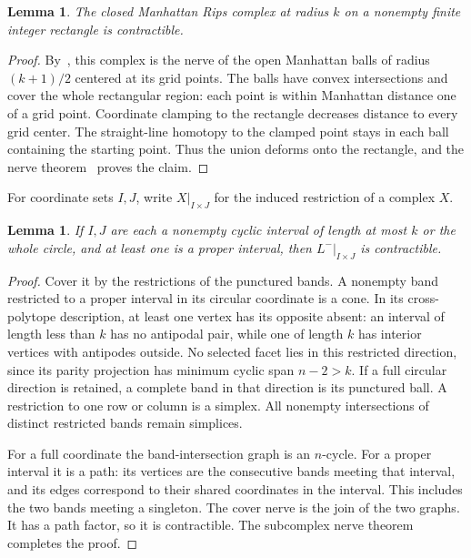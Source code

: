 \documentclass[11pt]{amsart}
\newtheorem{lemma}[theorem]{Lemma}
\begin{document}
\begin{lemma}\label{lem:rectangle}
The closed Manhattan Rips complex at radius \(k\) on a nonempty finite
integer rectangle is contractible.
\end{lemma}

\begin{proof}
By~\cite[Corollary~4.3]{torus}, this complex is the nerve of the open
Manhattan balls of radius \((k+1)/2\) centered at its grid points.
The balls have convex intersections and cover the whole rectangular region:
each point is within Manhattan distance one of a grid point.
Coordinate clamping to the rectangle decreases distance to every grid
center. The straight-line homotopy to the clamped point stays in each ball
containing the starting point. Thus the union deforms onto the rectangle,
and the nerve theorem~\cite[Theorem~10.7]{bjorner} proves the claim.
\end{proof}

For coordinate sets \(I,J\), write \(X|_{I\times J}\) for the induced
restriction of a complex \(X\).

\begin{lemma}\label{lem:restricted-bands}
If \(I,J\) are each a nonempty cyclic interval of length at most \(k\)
or the whole circle, and at least one is a proper interval, then
\(L^-|_{I\times J}\) is contractible.
\end{lemma}

\begin{proof}
Cover it by the restrictions of the punctured bands.
A nonempty band restricted to a proper interval in its circular
coordinate is a cone. In its
cross-polytope description, at least one vertex has its opposite absent:
an interval of length less than \(k\) has no antipodal pair, while one
of length \(k\) has interior vertices with antipodes outside.
No selected facet lies in this restricted direction, since its parity
projection has minimum cyclic span \(n-2>k\).
If a full circular direction is retained, a complete band in that
direction is its punctured ball. A restriction to one row or column is
a simplex. All nonempty intersections of distinct restricted bands remain
simplices.

For a full coordinate the band-intersection graph is an \(n\)-cycle.
For a proper interval it is a path: its vertices are the consecutive bands
meeting that interval, and its edges correspond to their shared
coordinates in the interval. This includes the two bands meeting a
singleton. The cover nerve is the join of the two graphs. It has a path
factor, so it is contractible. The subcomplex nerve theorem completes
the proof.
\end{proof}
\end{document}
